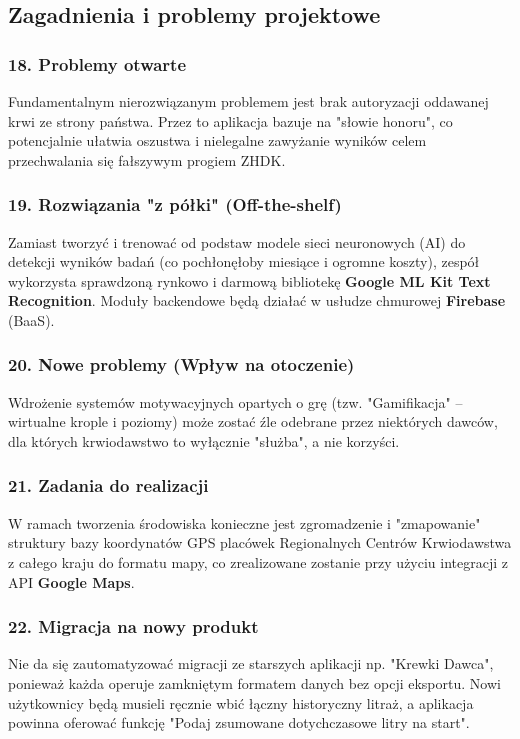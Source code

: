 \documentclass[11pt, a4paper]{article}
\begin{document}
\subsection{Zagadnienia i problemy projektowe}

\subsubsection{18. Problemy otwarte}
Fundamentalnym nierozwiązanym problemem jest brak autoryzacji oddawanej krwi ze strony państwa. Przez to aplikacja bazuje na "słowie honoru", co potencjalnie ułatwia oszustwa i nielegalne zawyżanie wyników celem przechwalania się fałszywym progiem ZHDK.

\subsubsection{19. Rozwiązania "z półki" (Off-the-shelf)}
Zamiast tworzyć i trenować od podstaw modele sieci neuronowych (AI) do detekcji wyników badań (co pochłonęłoby miesiące i ogromne koszty), zespół wykorzysta sprawdzoną rynkowo i darmową bibliotekę \textbf{Google ML Kit Text Recognition}. Moduły backendowe będą działać w usłudze chmurowej \textbf{Firebase} (BaaS).

\subsubsection{20. Nowe problemy (Wpływ na otoczenie)}
Wdrożenie systemów motywacyjnych opartych o grę (tzw. "Gamifikacja" – wirtualne krople i poziomy) może zostać źle odebrane przez niektórych dawców, dla których krwiodawstwo to wyłącznie "służba", a nie korzyści.

\subsubsection{21. Zadania do realizacji}
W ramach tworzenia środowiska konieczne jest zgromadzenie i "zmapowanie" struktury bazy koordynatów GPS placówek Regionalnych Centrów Krwiodawstwa z całego kraju do formatu mapy, co zrealizowane zostanie przy użyciu integracji z API \textbf{Google Maps}.

\subsubsection{22. Migracja na nowy produkt}
Nie da się zautomatyzować migracji ze starszych aplikacji np. "Krewki Dawca", ponieważ każda operuje zamkniętym formatem danych bez opcji eksportu. Nowi użytkownicy będą musieli ręcznie wbić łączny historyczny litraż, a aplikacja powinna oferować funkcję "Podaj zsumowane dotychczasowe litry na start".
\end{document}
